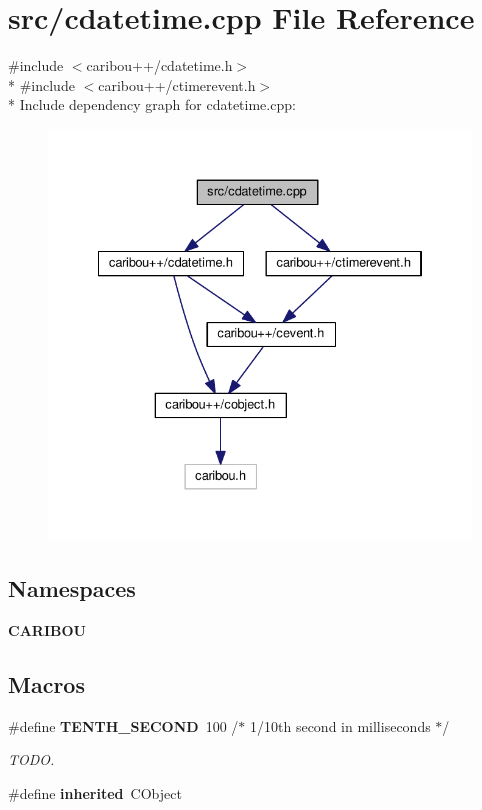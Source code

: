 \section{src/cdatetime.cpp File Reference}
\label{cdatetime_8cpp}
{\ttfamily \#include $<$caribou++/cdatetime.\+h$>$}\\*
{\ttfamily \#include $<$caribou++/ctimerevent.\+h$>$}\\*
Include dependency graph for cdatetime.\+cpp\+:
\nopagebreak
\begin{figure}[H]
\begin{center}
\leavevmode
\includegraphics[width=334pt]{cdatetime_8cpp__incl}
\end{center}
\end{figure}
\subsection*{Namespaces}
\begin{DoxyCompactItemize}
\item 
 {\bf C\+A\+R\+I\+B\+OU}
\end{DoxyCompactItemize}
\subsection*{Macros}
\begin{DoxyCompactItemize}
\item 
\#define {\bf T\+E\+N\+T\+H\+\_\+\+S\+E\+C\+O\+ND}~100  /$\ast$ 1/10th second in milliseconds $\ast$/
\begin{DoxyCompactList}\small\item\em T\+O\+DO. \end{DoxyCompactList}\item 
\#define {\bf inherited}~C\+Object
\end{DoxyCompactItemize}


